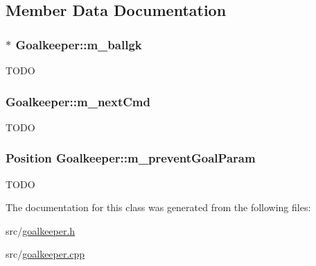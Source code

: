 \subsection{Member Data Documentation}
\hypertarget{classGoalkeeper_a8fc8e75ffc8d3582d293b0fe42a0c073}{
\subsubsection[{m\_\-ballgk}]{$\ast$ {\bf Goalkeeper::m\_\-ballgk}}}
\label{classGoalkeeper_a8fc8e75ffc8d3582d293b0fe42a0c073}
TODO \hypertarget{classGoalkeeper_a84e9e9f514d0ace81c95e03ee832aea8}{
\subsubsection[{m\_\-nextCmd}]{ {\bf Goalkeeper::m\_\-nextCmd}}}
\label{classGoalkeeper_a84e9e9f514d0ace81c95e03ee832aea8}
TODO \hypertarget{classGoalkeeper_a04b3ca2b51698e36928ccce7569842eb}{
\subsubsection[{m\_\-preventGoalParam}]{\setlength{\rightskip}{0pt plus 5cm}Position {\bf Goalkeeper::m\_\-preventGoalParam}}}
\label{classGoalkeeper_a04b3ca2b51698e36928ccce7569842eb}
TODO 

The documentation for this class was generated from the following files:\begin{DoxyCompactItemize}
\item 
src/\hyperlink{goalkeeper_8h}{goalkeeper.h}\item 
src/\hyperlink{goalkeeper_8cpp}{goalkeeper.cpp}\end{DoxyCompactItemize}
